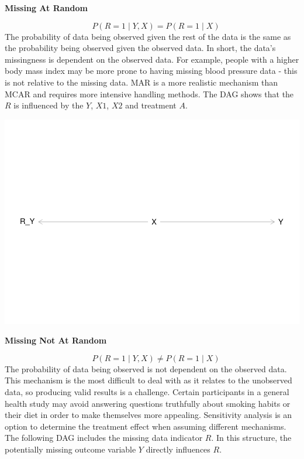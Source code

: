 \documentclass{article}
\newcommand{\pandocbounded}[1]{#1}
\begin{document}
\textbf{Missing At Random}

\[\quad P(R = 1 \mid Y, X) = P(R = 1 \mid X)\] The probability of data
being observed given the rest of the data is the same as the probability
being observed given the observed data. In short, the data's missingness
is dependent on the observed data. For example, people with a higher
body mass index may be more prone to having missing blood pressure data
- this is not relative to the missing data. MAR is a more realistic
mechanism than MCAR and requires more intensive handling methods. The
DAG shows that the \(R\) is influenced by the \(Y\), \(X1\), \(X2\) and
treatment \(A\).

\pandocbounded{\includegraphics[keepaspectratio]{Final_Report_files/figure-latex/unnamed-chunk-2-1.pdf}}

\textbf{Missing Not At Random}

\[\quad P(R = 1 \mid Y, X) \ne P(R = 1 \mid X)\] The probability of data
being observed is not dependent on the observed data. This mechanism is
the most difficult to deal with as it relates to the unobserved data, so
producing valid results is a challenge. Certain participants in a
general health study may avoid answering questions truthfully about
smoking habits or their diet in order to make themselves more appealing.
Sensitivity analysis is an option to determine the treatment effect when
assuming different mechanisms. The following DAG includes the missing
data indicator \(R\). In this structure, the potentially missing outcome
variable \(Y\) directly influences \(R\).
\end{document}
